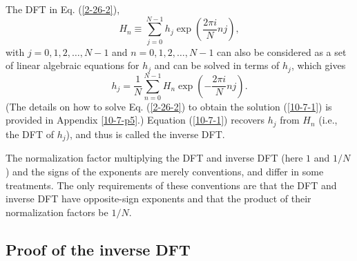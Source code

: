 \documentclass{article}
\begin{document}
The DFT in Eq. (\ref{2-26-2}),
\[ H_n \equiv \sum_{j = 0}^{N - 1} h_j \exp \left( \frac{2 \pi i}{N} n j
   \right), \]
with $j = 0, 1, 2, \ldots, N - 1$ and $n = 0, 1, 2, \ldots, N - 1$ can also be
considered as a set of linear algebraic equations for $h_j$ and can be solved
in terms of $h_j$, which gives
\begin{equation}
  \label{10-7-1} h_j = \frac{1}{N} \sum_{n = 0}^{N - 1} H_n \exp \left( -
  \frac{2 \pi i}{N} n j \right) .
\end{equation}
(The details on how to solve Eq. (\ref{2-26-2}) to obtain the solution
(\ref{10-7-1}) is provided in Appendix \ref{10-7-p5}.) Equation (\ref{10-7-1})
recovers $h_j$ from $H_n$ (i.e., the DFT of $h_j$), and thus is called the
inverse DFT.

The normalization factor multiplying the DFT and inverse DFT (here $1$ and $1
/ N$) and the signs of the exponents are merely conventions, and differ in
some treatments. The only requirements of these conventions are that the DFT
and inverse DFT have opposite-sign exponents and that the product of their
normalization factors be $1 / N$.

\subsection{\label{10-7-p5}Proof of the inverse DFT}
\end{document}
